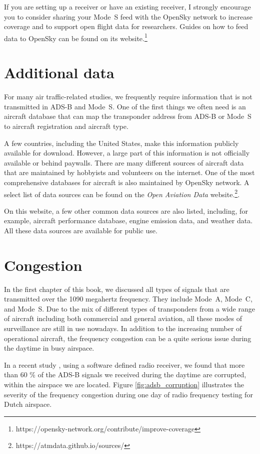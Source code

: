 If you are setting up a receiver or have an existing receiver, I strongly encourage you to consider sharing your Mode~S feed with the OpenSky network to increase coverage and to support open flight data for researchers. Guides on how to feed data to OpenSky can be found on its website.\footnote{https://opensky-network.org/contribute/improve-coverage}

\section{Additional data}

For many air traffic-related studies, we frequently require information that is not transmitted in ADS-B and Mode~S. One of the first things we often need is an aircraft database that can map the transponder address from ADS-B or Mode~S to aircraft registration and aircraft type. 

A few countries, including the United States, make this information publicly available for download. However, a large part of this information is not officially available or behind paywalls. There are many different sources of aircraft data that are maintained by hobbyists and volunteers on the internet. One of the most comprehensive databases for aircraft is also maintained by OpenSky network. A select list of data sources can be found on the \emph{Open Aviation Data} website.\footnote{https://atmdata.github.io/sources/}.

On this website, a few other common data sources are also listed, including, for example, aircraft performance database, engine emission data, and weather data. All these data sources are available for public use.


\section{Congestion}
In the first chapter of this book, we discussed all types of signals that are transmitted over the 1090 megahertz frequency. They include Mode~A, Mode~C, and Mode~S. Due to the mix of different types of transponders from a wide range of aircraft including both commercial and general aviation, all these modes of surveillance are still in use nowadays. In addition to the increasing number of operational aircraft, the frequency congestion can be a quite serious issue during the daytime in busy airspace. 

In a recent study \cite{sun2020rf}, using a software defined radio receiver, we found that more than 60 \% of the ADS-B signals we received during the daytime are corrupted, within the airspace we are located. Figure \ref{fig:adsb_corruption} illustrates the severity of the frequency congestion during one day of radio frequency testing for Dutch airspace.

